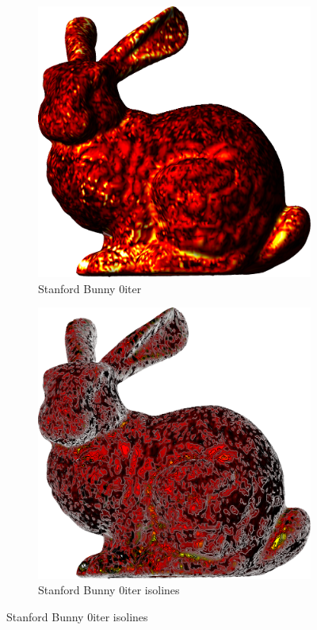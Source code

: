 \begin{figure}[ht]
\ffigbox
	{\begin{subfigure}[b]{0.48\linewidth}
		\includegraphics[width=1.0\linewidth,height=0.3\textheight,keepaspectratio]{data/acquired_meshes/bun_zipper_edited_r1_n4_v256_funcvals_0iter.png}
		\caption{Stanford Bunny 0iter}\label{fig:bun.a}
	\end{subfigure}
	\begin{subfigure}[b]{0.48\linewidth}
		\includegraphics[width=1.0\linewidth,height=0.3\textheight,keepaspectratio]{data/acquired_meshes/bun_zipper_edited_r1_n4_v256_funcvals_isolines_0iter.png}
		\caption{Stanford Bunny 0iter isolines}\label{fig:bun.b}
	\end{subfigure}

}
\end{figure}
